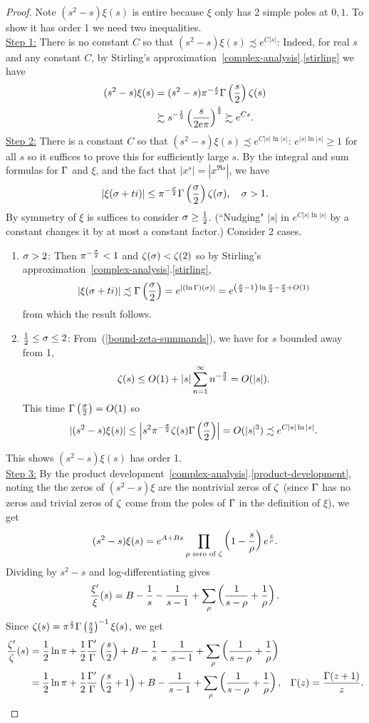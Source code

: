 \begin{proof}
Note $(s^2-s)\xi(s)$ is entire because $\xi$ only has 2 simple poles at $0,1$. To show it has order 1 we need two inequalities.\\

\noindent \underline{Step 1:} There is no constant $C$ so that $(s^2-s)\xi(s)\precsim e^{C|s|}$: Indeed, for real $s$ and any constant $C$, by Stirling's approximation~\ref{complex-analysis}.\ref{stirling} we have
\begin{align*}
(s^2-s)\xi(s)&=(s^2-s)\pi^{-\frac s2}\Gamma\left( {\frac{s}{2}} \right)\zeta(s)\\
&\succsim s^{-\frac{1}{2}}\left( {\frac{s}{2e\pi}} \right)^{\frac s2}
\succsim e^{Cs}.
\end{align*}
\noindent\underline{Step 2:} There is a constant $C$ so that $(s^2-s)\xi(s)\precsim e^{C|s|\ln|s|}$: $e^{|s|\ln|s|}\ge1$ for all $s$ so it suffices to prove this for sufficiently large $s$. By the integral and sum formulas for $\Gamma$ and $\xi$, and the fact that $|x^s|=|x^{\Re s}|$, we have
\[
|\xi(\sigma+ti)|\le \pi^{-\frac{\sigma}{2}}\Gamma\left( {\frac{\sigma}{2}} \right)\zeta(\sigma),\quad \sigma>1.
\]
By symmetry of $\xi$ is suffices to consider $\sigma\ge \frac{1}{2}$. (``Nudging" $|s|$ in $e^{C|s|\ln|s|}$ by a constant changes it by at most a constant factor.)
Consider 2 cases.
\begin{enumerate}
\item
$\sigma>2$: Then $\pi^{-\frac{\sigma}{2}}<1$ and $\zeta(\sigma)<\zeta(2)$ so by Stirling's approximation~\ref{complex-analysis}.\ref{stirling},
\[
|\xi(\sigma+ti)|\precsim
\Gamma\left( {\frac{\sigma}{2}} \right)
=e^{|(\ln\Gamma)(\sigma)|}=e^{\left( {\frac{\sigma}2-1} \right)\ln\frac{\sigma}2-\frac{\sigma}2+O(1)}
\]
from which the result follows.
\item
$\frac12\le \sigma\le 2$: From~(\ref{bound-zeta-summands}), we have for $s$ bounded away from 1,
\[
\zeta(s)\le O(1)+|s| \sum_{n=1}^{\infty} n^{-\frac 32}=O(|s|).
\]
This time $\Gamma\left( {\frac{\sigma}{2}} \right)=O(1)$ so
\[
|(s^2-s)\xi(s)|\le \left| {
s^2\pi^{-\frac{\sigma}2}\zeta(s)\Gamma\left( {\frac{\sigma}{2}} \right)} \right|
=O(|s|^3)\precsim e^{C|s|\ln|s|}.
\]
\end{enumerate}
This shows $(s^2-s)\xi(s)$ has order 1.\\

\noindent\underline{Step 3:} By the product development~\ref{complex-analysis}.\ref{product-development}, noting the the zeros of $(s^2-s)\xi$ are the nontrivial zeros of $\zeta$ (since $\Gamma$ has no zeros and trivial zeros of $\zeta$ come from the poles of $\Gamma$ in the definition of $\xi$), we get
\[
(s^2-s)\xi(s)=e^{A+Bs}\prod_{\rho\text{ zero of }\zeta}\left( {1-\frac{s}{\rho}} \right)e^{\frac s{\rho}}.
\]
Dividing by $s^2-s$ and log-differentiating gives
\[
\frac{\xi'}{\xi}(s)=B-\frac{1}{s}-\frac{1}{s-1}+\sum_{\rho} \left( {\frac{1}{s-\rho}+\frac{1}{\rho}} \right).
\]
Since $\zeta(s)=\pi^{\frac s2}\Gamma\left( {\frac{s}{2}} \right)^{-1}\xi(s)$, we get
\begin{align*}
\frac{\zeta'}{\zeta}(s)&=\frac{1}{2}\ln\pi +\frac{1}{2}\frac{\Gamma'}{\Gamma}\left( {\frac{s}{2}} \right)+B-\frac{1}{s}-\frac{1}{s-1}+\sum_{\rho} \left( {\frac{1}{s-\rho}+\frac{1}{\rho}} \right)\\
&=\frac{1}{2}\ln\pi +\frac{1}{2}\frac{\Gamma'}{\Gamma}\left( {\frac{s}{2}+1} \right)+B-\frac{1}{s-1}+\sum_{\rho} \left( {\frac{1}{s-\rho}+\frac{1}{\rho}} \right),&\Gamma(z)=\frac{\Gamma(z+1)}{z}.\qedhere
\end{align*}
\end{proof}
